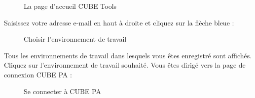 \begin{figure}[H]
\caption{La page d'accueil CUBE Tools}
\end{figure}

Saisissez votre adresse e-mail en haut à droite et cliquez sur la flèche bleue :

\begin{figure}[H]
\caption{Choisir l'environnement de travail}
\end{figure}

Tous les environnements de travail dans lesquels vous êtes enregistré sont affichés. Cliquez sur l'environnement de travail souhaité. Vous êtes dirigé vers la page de connexion CUBE PA :

\begin{figure}[H]
\caption{Se connecter à CUBE PA}
\end{figure}

